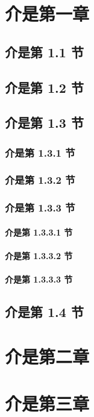 \documentclass[degree = phd]{./Template/Thesis}
\begin{document}
  \maketitle
  \tableofcontents

  \chapter{介是第一章}
  \section{介是第 1.1 节}
  \section{介是第 1.2 节}
  \section{介是第 1.3 节}
  \subsection{介是第 1.3.1 节}
  \subsection{介是第 1.3.2 节}
  \subsection{介是第 1.3.3 节}
  \subsubsection{介是第 1.3.3.1 节}
  \subsubsection{介是第 1.3.3.2 节}
  \subsubsection{介是第 1.3.3.3 节}
  \section{介是第 1.4 节}
  \chapter{介是第二章}
  \chapter{介是第三章}
\end{document}

